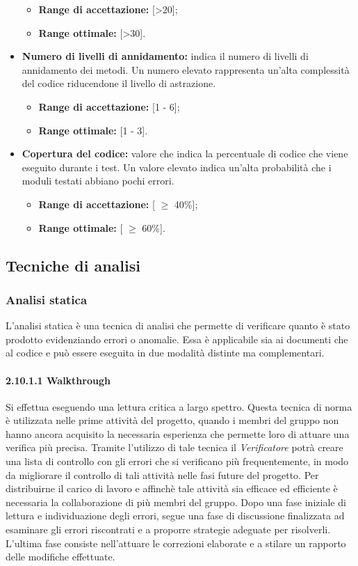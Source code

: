 \begin{itemize}
\begin{itemize}
		\item \textbf{Range di accettazione:} [>20];
		\item \textbf{Range ottimale:} [>30].
	\end{itemize}
	\item \textbf{Numero di livelli di annidamento:} indica il numero di livelli di annidamento dei metodi. Un numero elevato rappresenta un'alta complessità del codice riducendone il livello di astrazione.
	\begin{itemize}
		\item \textbf{Range di accettazione:} [1 - 6];
		\item \textbf{Range ottimale:} [1 - 3].
	\end{itemize}
	\item \textbf{Copertura del codice:} valore che indica la percentuale di codice che viene eseguito durante i test.
	Un valore elevato indica un'alta probabilità che i moduli testati abbiano pochi errori.
	\begin{itemize}
		\item \textbf{Range di accettazione:} [ $\geq$ 40\%];
		\item \textbf{Range ottimale:} [ $\geq$ 60\%].
	\end{itemize}
\end{itemize}

\subsection{Tecniche di analisi}
\subsubsection{Analisi statica}
L'analisi statica è una tecnica di analisi che permette di verificare quanto è stato prodotto evidenziando errori o anomalie. Essa è applicabile sia ai documenti che al codice e può essere eseguita in due modalità distinte ma complementari.

\paragraph{2.10.1.1 Walkthrough}
Si effettua eseguendo una lettura critica a largo spettro. Questa tecnica di norma è utilizzata nelle prime attività del progetto, quando i membri del gruppo non hanno ancora acquisito la necessaria esperienza che permette loro di attuare una verifica più precisa. Tramite l'utilizzo di tale tecnica il \textit{Verificatore} potrà creare una lista di controllo con gli errori che si verificano più frequentemente, in modo da 	migliorare il controllo di tali attività nelle fasi future del progetto.
Per distribuirne il carico di lavoro e affinchè tale attività sia efficace ed efficiente è necessaria la collaborazione di più membri del gruppo. Dopo una fase iniziale di lettura e individuazione degli errori, segue una fase di discussione finalizzata ad esaminare gli errori riscontrati e a proporre strategie adeguate per risolverli. L'ultima fase consiste nell'attuare le correzioni elaborate e a stilare un rapporto delle modifiche effettuate.

